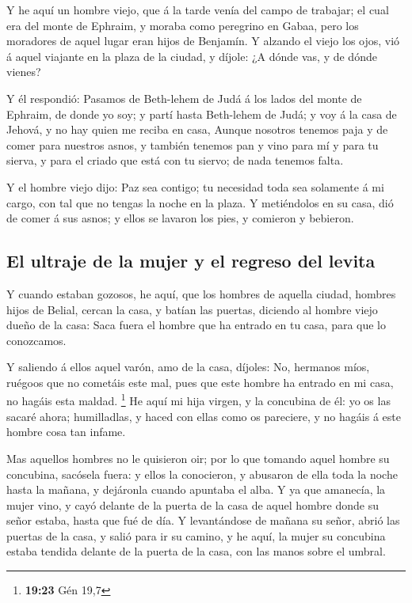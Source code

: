  Y he aquí un hombre viejo, que á la tarde venía del campo
de trabajar; el cual era del monte de Ephraim, y moraba como peregrino
en Gabaa, pero los moradores de aquel lugar eran hijos de Benjamín.
 Y alzando el viejo los ojos, vió á aquel viajante en la
plaza de la ciudad, y díjole: ¿A dónde vas, y de dónde vienes?

 Y él respondió: Pasamos de Beth-lehem de Judá á los lados
del monte de Ephraim, de donde yo soy; y partí hasta Beth-lehem de Judá;
y voy á la casa de Jehová, y no hay quien me reciba en casa,
 Aunque nosotros tenemos paja y de comer para nuestros
asnos, y también tenemos pan y vino para mí y para tu sierva, y para el
criado que está con tu siervo; de nada tenemos falta.

 Y el hombre viejo dijo: Paz sea contigo; tu necesidad toda
sea solamente á mi cargo, con tal que no tengas la noche en la plaza.
 Y metiéndolos en su casa, dió de comer á sus asnos; y
ellos se lavaron los pies, y comieron y bebieron.

\hypertarget{el-ultraje-de-la-mujer-y-el-regreso-del-levita}{%
\subsection{El ultraje de la mujer y el regreso del
levita}\label{el-ultraje-de-la-mujer-y-el-regreso-del-levita}}

 Y cuando estaban gozosos, he aquí, que los hombres de
aquella ciudad, hombres hijos de Belial, cercan la casa, y batían las
puertas, diciendo al hombre viejo dueño de la casa: Saca fuera el hombre
que ha entrado en tu casa, para que lo conozcamos.

 Y saliendo á ellos aquel varón, amo de la casa, díjoles:
No, hermanos míos, ruégoos que no cometáis este mal, pues que este
hombre ha entrado en mi casa, no hagáis esta maldad. \footnote{\textbf{19:23}
  Gén 19,7}  He aquí mi hija virgen, y la concubina de él:
yo os las sacaré ahora; humilladlas, y haced con ellas como os
pareciere, y no hagáis á este hombre cosa tan infame.

 Mas aquellos hombres no le quisieron oir; por lo que
tomando aquel hombre su concubina, sacósela fuera: y ellos la
conocieron, y abusaron de ella toda la noche hasta la mañana, y
dejáronla cuando apuntaba el alba.  Y ya que amanecía, la
mujer vino, y cayó delante de la puerta de la casa de aquel hombre donde
su señor estaba, hasta que fué de día.  Y levantándose de
mañana su señor, abrió las puertas de la casa, y salió para ir su
camino, y he aquí, la mujer su concubina estaba tendida delante de la
puerta de la casa, con las manos sobre el umbral.


